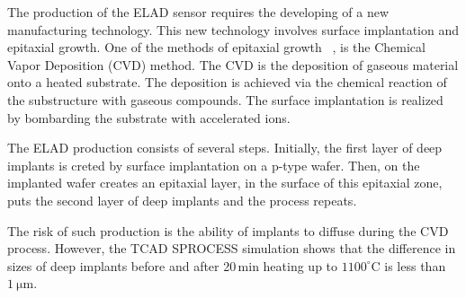 
The production of the ELAD sensor requires the developing of a new manufacturing technology. 
This new technology involves surface implantation and epitaxial growth. 
One of the methods of epitaxial growth ~\cite{Lutz}, is the Chemical Vapor Deposition (CVD) method. The CVD is the deposition of gaseous material onto a heated substrate. 
The deposition is achieved via the chemical reaction of the substructure with gaseous compounds. 
The surface implantation is realized by bombarding the substrate with accelerated ions.

The ELAD production consists of several steps. Initially, the first layer of deep implants is creted by surface implantation on a p-type wafer. 
Then, on the implanted wafer creates an epitaxial layer, in the surface of this epitaxial zone, puts the second layer of deep implants and the process repeats. 

The risk of such production is the ability of implants to diffuse during the CVD process. 
However, the TCAD SPROCESS simulation shows that the difference in sizes of deep implants before and after 20\,min heating up to $1100^\circ$C is less than $\SI{1}{\um}$. 
